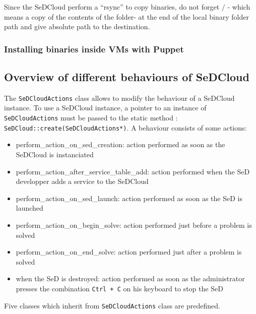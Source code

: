 Since the SeDCloud perform a ``rsync'' to copy binaries, do not forget
$/$ - which means a copy of the contents of the folder- at the end of
the local binary folder path and give absolute path to the
destination.

\subsubsection{Installing binaries inside VMs with Puppet}



\subsection{Overview of different behaviours of SeDCloud\label{sec:SeDCloudActions}}



The \texttt{SeDCloudActions} class allows to modify the behaviour of a
SeDCloud instance. To use a SeDCloud instance, a pointer to an
instance of \texttt{SeDCloudActions} must be passed to the static
method : \texttt{SeDCloud::create(SeDCloudActions*)}. A behaviour
consists of some actions:

\begin{itemize}
  \item perform\_action\_on\_sed\_creation: action performed as soon as the SeDCloud is instanciated
  \item perform\_action\_after\_service\_table\_add: action performed when the SeD developper adds a service to the SeDCloud
  \item perform\_action\_on\_sed\_launch: action performed as soon as the SeD is launched
  \item perform\_action\_on\_begin\_solve: action performed just before a problem is solved
  \item perform\_action\_on\_end\_solve: action performed just after a problem is solved
  \item when the SeD is destroyed: action performed as soon as the
    administrator presses the combination \texttt{Ctrl + C} on his keyboard to stop the SeD
\end{itemize}
Five classes which inherit from \texttt{SeDCloudActions} class are predefined.


